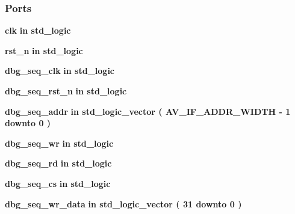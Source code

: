 \subsubsection*{Ports}
 \begin{DoxyCompactItemize}
\item 
{\bf clk}  {\bfseries {\bfseries \textcolor{keywordflow}{in}\textcolor{vhdlchar}{ }}} {\bfseries \textcolor{comment}{std\+\_\+logic}\textcolor{vhdlchar}{ }} 
\item 
{\bf rst\+\_\+n}  {\bfseries {\bfseries \textcolor{keywordflow}{in}\textcolor{vhdlchar}{ }}} {\bfseries \textcolor{comment}{std\+\_\+logic}\textcolor{vhdlchar}{ }} 
\item 
{\bf dbg\+\_\+seq\+\_\+clk}  {\bfseries {\bfseries \textcolor{keywordflow}{in}\textcolor{vhdlchar}{ }}} {\bfseries \textcolor{comment}{std\+\_\+logic}\textcolor{vhdlchar}{ }} 
\item 
{\bf dbg\+\_\+seq\+\_\+rst\+\_\+n}  {\bfseries {\bfseries \textcolor{keywordflow}{in}\textcolor{vhdlchar}{ }}} {\bfseries \textcolor{comment}{std\+\_\+logic}\textcolor{vhdlchar}{ }} 
\item 
{\bf dbg\+\_\+seq\+\_\+addr}  {\bfseries {\bfseries \textcolor{keywordflow}{in}\textcolor{vhdlchar}{ }}} {\bfseries \textcolor{comment}{std\+\_\+logic\+\_\+vector}\textcolor{vhdlchar}{ }\textcolor{vhdlchar}{(}\textcolor{vhdlchar}{ }\textcolor{vhdlchar}{ }\textcolor{vhdlchar}{ }\textcolor{vhdlchar}{ }{\bfseries {\bf A\+V\+\_\+\+I\+F\+\_\+\+A\+D\+D\+R\+\_\+\+W\+I\+D\+TH}} \textcolor{vhdlchar}{-\/}\textcolor{vhdlchar}{ } \textcolor{vhdldigit}{1} \textcolor{vhdlchar}{ }\textcolor{keywordflow}{downto}\textcolor{vhdlchar}{ }\textcolor{vhdlchar}{ } \textcolor{vhdldigit}{0} \textcolor{vhdlchar}{ }\textcolor{vhdlchar}{)}\textcolor{vhdlchar}{ }} 
\item 
{\bf dbg\+\_\+seq\+\_\+wr}  {\bfseries {\bfseries \textcolor{keywordflow}{in}\textcolor{vhdlchar}{ }}} {\bfseries \textcolor{comment}{std\+\_\+logic}\textcolor{vhdlchar}{ }} 
\item 
{\bf dbg\+\_\+seq\+\_\+rd}  {\bfseries {\bfseries \textcolor{keywordflow}{in}\textcolor{vhdlchar}{ }}} {\bfseries \textcolor{comment}{std\+\_\+logic}\textcolor{vhdlchar}{ }} 
\item 
{\bf dbg\+\_\+seq\+\_\+cs}  {\bfseries {\bfseries \textcolor{keywordflow}{in}\textcolor{vhdlchar}{ }}} {\bfseries \textcolor{comment}{std\+\_\+logic}\textcolor{vhdlchar}{ }} 
\item 
{\bf dbg\+\_\+seq\+\_\+wr\+\_\+data}  {\bfseries {\bfseries \textcolor{keywordflow}{in}\textcolor{vhdlchar}{ }}} {\bfseries \textcolor{comment}{std\+\_\+logic\+\_\+vector}\textcolor{vhdlchar}{ }\textcolor{vhdlchar}{(}\textcolor{vhdlchar}{ }\textcolor{vhdlchar}{ } \textcolor{vhdldigit}{31} \textcolor{vhdlchar}{ }\textcolor{keywordflow}{downto}\textcolor{vhdlchar}{ }\textcolor{vhdlchar}{ } \textcolor{vhdldigit}{0} \textcolor{vhdlchar}{ }\textcolor{vhdlchar}{)}\textcolor{vhdlchar}{ }} 

\end{DoxyCompactItemize}
